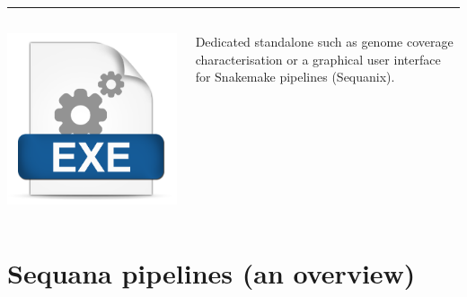 \documentclass{beamer}
\begin{document}
\begin{frame}
\rule{\textwidth}{1pt}


\begin{columns}
\begin{column}{1.5cm}
\includegraphics[height=0.2\textheight]{images/exe.png}
\end{column}
\begin{column}{9cm}
Dedicated standalone such as genome coverage characterisation or a graphical 
user interface for Snakemake pipelines (Sequanix).
\end{column}
\end{columns}



\end{frame}




\section{Sequana pipelines (an overview)}
\end{document}
